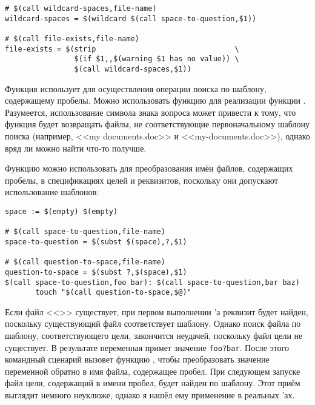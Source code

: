 {\footnotesize
\begin{verbatim}
# $(call wildcard-spaces,file-name)
wildcard-spaces = $(wildcard $(call space-to-question,$1))

# $(call file-exists,file-name)
file-exists = $(strip                                \
                $(if $1,,$(warning $1 has no value)) \
                $(call wildcard-spaces,$1))
\end{verbatim}
}

Функция  использует
 для осуществления операции поиска по
шаблону, содержащему пробелы. Можно использовать функцию
 для реализации функции
\function{file-exists}. Разумеется, использование символа знака
вопроса может привести к тому, что функция \function{wildcard-spaces}
будет возвращать файлы, не соответствующие первоначальному шаблону
поиска (например, <<my documents.doc>> и <<my-documents.doc>>), однако
вряд ли можно найти что-то получше.

Функцию  можно использовать для
преобразования имён файлов, содержащих пробелы, в спецификациях целей
и реквизитов, поскольку они допускают использование шаблонов:

{\footnotesize
\begin{verbatim}
space := $(empty) $(empty)

# $(call space-to-question,file-name)
space-to-question = $(subst $(space),?,$1)

# $(call question-to-space,file-name)
question-to-space = $(subst ?,$(space),$1)
$(call space-to-question,foo bar): $(call space-to-question,bar baz)
       touch "$(call question-to-space,$@)"
\end{verbatim}
}

Если файл <<>> существует, при первом выполнении
\Makefile{}'а реквизит будет найден, поскольку существующий файл
соответствует шаблону. Однако поиск файла по шаблону, соответствующего
цели, закончится неудачей, поскольку файл цели не существует. В
результате переменная  примет значение \texttt{foo?bar}.
После этого командный сценарий вызовет функцию
\function{question-to-space}, чтобы преобразовать значение переменной
\variable{\$@} обратно в имя файла, содержащее пробел. При следующем
запуске файл цели, содержащий в имени пробел, будет найден по шаблону.
Этот приём выглядит немного неуклюже, однако я нашёл ему применение в
реальных \Makefile{}'ах.


